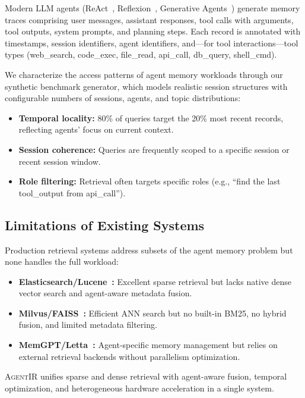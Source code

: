 \documentclass[sigconf,nonacm,anonymous]{acmart}
\newcommand{\sysname}{\textsc{AgentIR}}
\begin{document}
Modern LLM agents (ReAct~\cite{yao2023react},
Reflexion~\cite{shinn2023reflexion}, Generative
Agents~\cite{park2023generative}) generate memory traces
comprising user messages, assistant responses, tool calls with
arguments, tool outputs, system prompts, and planning steps.  Each
record is annotated with timestamps, session identifiers, agent
identifiers, and—for tool interactions—tool types (web\_search,
code\_exec, file\_read, api\_call, db\_query, shell\_cmd).

We characterize the access patterns of agent memory workloads
through our synthetic benchmark generator, which models realistic
session structures with configurable numbers of sessions, agents,
and topic distributions:

\begin{itemize}
\item \textbf{Temporal locality:} 80\% of queries target the 20\%
  most recent records, reflecting agents' focus on current context.
\item \textbf{Session coherence:} Queries are frequently scoped
  to a specific session or recent session window.
\item \textbf{Role filtering:} Retrieval often targets specific
  roles (e.g., ``find the last tool\_output from api\_call'').
\end{itemize}

\subsection{Limitations of Existing Systems}

Production retrieval systems address subsets of the agent memory
problem but none handles the full workload:

\begin{itemize}
\item \textbf{Elasticsearch/Lucene~\cite{yang2017anserini}:} Excellent
  sparse retrieval but lacks native dense vector search and
  agent-aware metadata fusion.
\item \textbf{Milvus/FAISS~\cite{johnson2021faiss}:} Efficient ANN
  search but no built-in BM25, no hybrid fusion, and limited
  metadata filtering.
\item \textbf{MemGPT/Letta~\cite{packer2024memgpt}:} Agent-specific
  memory management but relies on external retrieval backends
  without parallelism optimization.
\end{itemize}

\sysname{} unifies sparse and dense retrieval with agent-aware
fusion, temporal optimization, and heterogeneous hardware
acceleration in a single system.
\end{document}
